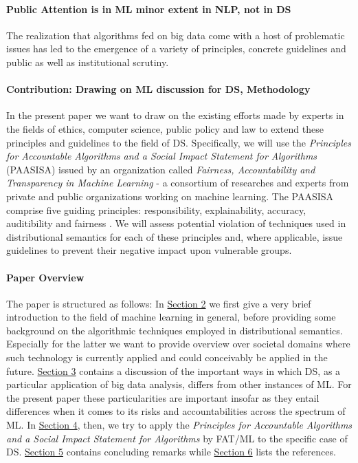 \documentclass{article}
\begin{document}
\paragraph{Public Attention is in ML minor extent in NLP, not in DS}
The realization that algorithms fed on big data come with a host of problematic issues has led to the emergence of a variety of principles, concrete guidelines and public as well as institutional scrutiny.

\paragraph{Contribution: Drawing on ML discussion for DS, Methodology}
In the present paper we want to draw on the existing efforts made by experts in the fields of ethics, computer science, public policy and law to extend these principles and guidelines to the field of DS. Specifically, we will use the \emph{Principles for Accountable Algorithms and a Social Impact Statement for Algorithms} (PAASISA) issued by an organization called \emph{Fairness, Accountability and Transparency in Machine Learning} - a consortium of researches and experts from private and public organizations working on machine learning. 
The PAASISA comprise five guiding principles: responsibility, explainability, accuracy, auditibility and fairness \cite{principles}.
We will assess potential violation of techniques used in distributional semantics for each of these principles and, where applicable, issue guidelines to prevent their negative impact upon vulnerable groups. 

\paragraph{Paper Overview}
The paper is structured as follows: In \hyperlink{sec2}{Section 2} we first give a very brief introduction to the field of machine learning in general, before providing some background on the algorithmic techniques employed in distributional semantics. Especially for the latter we want to provide overview over societal domains where such technology is currently applied and could conceivably be applied in the future. \hyperlink{sec3}{Section 3} contains a discussion of the important ways in which DS, as a particular application of big data analysis, differs from other instances of ML. For the present paper these particularities are important insofar as they entail differences when it comes to its risks and accountabilities across the spectrum of ML. In \hyperlink{sec4}{Section 4}, then, we try to apply the \emph{Principles for Accountable Algorithms and a Social Impact Statement for Algorithms} by FAT/ML to the specific case of DS. \hyperlink{sec5}{Section 5} contains concluding remarks while \hyperlink{sec6}{Section 6} lists the references.
\end{document}
